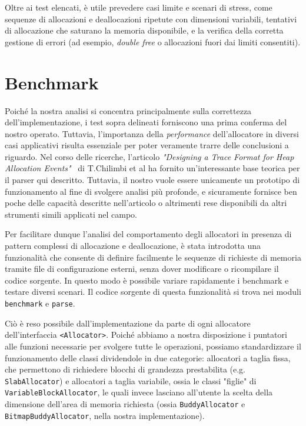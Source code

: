Oltre ai test elencati, è utile prevedere casi limite e scenari di stress, come sequenze di allocazioni e deallocazioni ripetute con dimensioni variabili, tentativi di allocazione che saturano la memoria disponibile, e la verifica della corretta gestione di errori (ad esempio, \emph{double free} o allocazioni fuori dai limiti consentiti).

\section{Benchmark}
Poiché la nostra analisi si concentra principalmente sulla correttezza dell'implementazione, i test sopra delineati forniscono una prima conferma del nostro operato. Tuttavia, l'importanza della \textit{performance} dell'allocatore in diversi casi applicativi risulta essenziale per poter veramente trarre delle conclusioni a riguardo. 
Nel corso delle ricerche, l'articolo \textit{"Designing a Trace Format for Heap Allocation Events"}~\cite{chilimbi2000} di T.Chilimbi et al ha fornito un'interessante base teorica per il parser qui descritto. Tuttavia, il nostro vuole essere unicamente un prototipo di funzionamento al fine di svolgere analisi più profonde, e sicuramente fornisce ben poche delle capacità descritte nell'articolo o altrimenti rese disponibili da altri strumenti simili applicati nel campo.\footnotemark


Per facilitare dunque l’analisi del comportamento degli allocatori in presenza di pattern complessi di allocazione e deallocazione, è stata introdotta una funzionalità che consente di definire facilmente le sequenze di richieste di memoria tramite file di configurazione esterni, senza dover modificare o ricompilare il codice sorgente. In questo modo è possibile variare rapidamente i benchmark e testare diversi scenari. Il codice sorgente di questa funzionalità si trova nei moduli \texttt{benchmark} e \texttt{parse}.

Ciò è reso possibile dall’implementazione da parte di ogni allocatore dell’interfaccia \texttt{<Allocator>}. Poiché abbiamo a nostra disposizione i puntatori alle funzioni necessarie per svolgere tutte le operazioni, possiamo standardizzare il funzionamento delle classi dividendole in due categorie: allocatori a taglia fissa, che permettono di richiedere blocchi di grandezza prestabilita (e.g. \texttt{SlabAllocator}) e allocatori a taglia variabile, ossia le classi "figlie" di \texttt{VariableBlockAllocator}, le quali invece lasciano all’utente la scelta della dimensione dell’area di memoria richiesta (ossia \texttt{BuddyAllocator} e \texttt{BitmapBuddyAllocator}, nella nostra implementazione).

